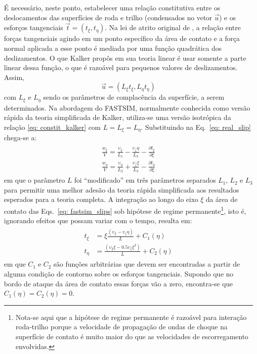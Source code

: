 É necessário, neste ponto, estabelecer uma relação constitutiva entre os deslocamentos das superfícies de roda e trilho
(condensados no vetor $\vec{u}$) e os esforços tangenciais $\vec{t} = \left(t_\xi,t_\eta\right)$. Na lei de atrito 
original de , a relação entre forças tangenciais agindo
em um ponto específico da área de contato e a força normal aplicada a esse ponto
é mediada por uma função quadrática dos deslizamentos. O que Kalker propôs em sua teoria linear é usar somente a parte linear 
dessa função, o que é razoável para pequenos valores de deslizamentos. Assim,
\begin{equation}
    \vec{u} = \left(L_\xi t_\xi,L_\eta t_\eta\right) \label{eq: constit_kalker}
\end{equation}
com $L_\xi$ e $L_\eta$ sendo os parâmetros de complacência da superfície, a serem determinados. Na abordagem do FASTSIM,
normalmente conhecida como versão rápida da teoria simplificada de Kalker, utiliza-se uma versão isotrópica da relação \eqref{eq: constit_kalker}
com $L=L_\xi=L_\eta$. Substituindo na Eq.~\eqref{eq: real_slip} chega-se a:
\begin{align}
    \begin{split}
        \frac{w_\xi}{V} = \frac{\upsilon_\xi}{L_1} - \frac{\upsilon_\zeta \eta}{L_3} - \frac{\partial t_\xi}{\partial \xi} \\
        \frac{w_\eta}{V} = \frac{\upsilon_\eta}{L_2} + \frac{\upsilon_\zeta \xi}{L_3} - \frac{\partial t_\eta}{\partial \xi}
    \end{split}
    \label{eq: fastsim_slips}
\end{align}
em que o parâmetro $L$ foi ``modificado'' em três parâmetros separados $L_1$, $L_2$ e $L_3$ para permitir uma melhor adesão
da teoria rápida simplificada aos resultados esperados para a teoria completa. A integração ao longo do eixo $\xi$ da área
de contato das Eqs.~\eqref{eq: fastsim_slips} sob hipótese de regime permanente\footnote{Nota-se aqui que a hipótese 
de regime permanente é razoável para interação roda-trilho porque a velocidade de 
propagação de ondas de choque  na superfície de contato é muito maior do que as velocidades de escorregamento
envolvidas.}, isto é, ignorando efeitos que possam variar com o tempo, resulta em:
\begin{align}
    \begin{split}
        t_\xi &= \xi\frac{\left(\upsilon_\xi - \upsilon_\zeta \eta\right)}{L} + C_1(\eta) \\
        t_\eta &= \frac{\left(\upsilon_\xi \xi - 0.5\upsilon_\zeta \xi^2\right)}{L} + C_2(\eta)
    \end{split}
\end{align}
em que $C_1$ e $C_2$ são funções arbitrárias que devem ser encontradas a partir de alguma condição
de contorno sobre os esforços tangenciais. Supondo que no bordo de ataque da área de contato essas
forças vão a zero, encontra-se que $C_1(\eta)=C_2(\eta)=0$.

